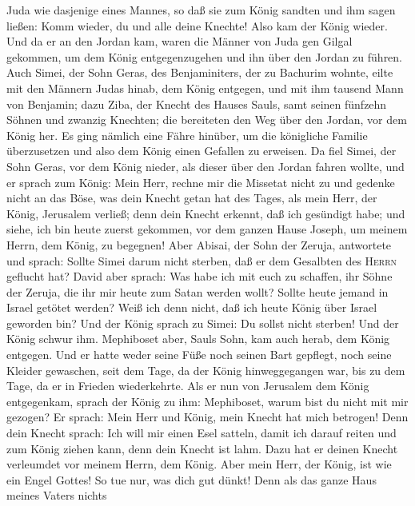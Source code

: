 Juda wie dasjenige eines Mannes, so daß sie zum König sandten und ihm
sagen ließen: Komm wieder, du und alle deine Knechte! 
Also kam der König wieder. Und da er an den Jordan kam, waren die Männer
von Juda gen Gilgal gekommen, um dem König entgegenzugehen und ihn über
den Jordan zu führen.  Auch Simei, der Sohn Geras, des
Benjaminiters, der zu Bachurim wohnte, eilte mit den Männern Judas
hinab, dem König entgegen,  und mit ihm tausend Mann von
Benjamin; dazu Ziba, der Knecht des Hauses Sauls, samt seinen fünfzehn
Söhnen und zwanzig Knechten; die bereiteten den Weg über den Jordan, vor
dem König her.  Es ging nämlich eine Fähre hinüber, um
die königliche Familie überzusetzen und also dem König einen Gefallen zu
erweisen. Da fiel Simei, der Sohn Geras, vor dem König nieder, als
dieser über den Jordan fahren wollte,  und er sprach zum
König: Mein Herr, rechne mir die Missetat nicht zu und gedenke nicht an
das Böse, was dein Knecht getan hat des Tages, als mein Herr, der König,
Jerusalem verließ;  denn dein Knecht erkennt, daß ich
gesündigt habe; und siehe, ich bin heute zuerst gekommen, vor dem ganzen
Hause Joseph, um meinem Herrn, dem König, zu begegnen! 
Aber Abisai, der Sohn der Zeruja, antwortete und sprach: Sollte Simei
darum nicht sterben, daß er dem Gesalbten des \textsc{Herrn} geflucht
hat?  David aber sprach: Was habe ich mit euch zu
schaffen, ihr Söhne der Zeruja, die ihr mir heute zum Satan werden
wollt? Sollte heute jemand in Israel getötet werden? Weiß ich denn
nicht, daß ich heute König über Israel geworden bin?  Und
der König sprach zu Simei: Du sollst nicht sterben! Und der König schwur
ihm.  Mephiboset aber, Sauls Sohn, kam auch herab, dem
König entgegen. Und er hatte weder seine Füße noch seinen Bart gepflegt,
noch seine Kleider gewaschen, seit dem Tage, da der König hinweggegangen
war, bis zu dem Tage, da er in Frieden wiederkehrte.  Als
er nun von Jerusalem dem König entgegenkam, sprach der König zu ihm:
Mephiboset, warum bist du nicht mit mir gezogen?  Er
sprach: Mein Herr und König, mein Knecht hat mich betrogen! Denn dein
Knecht sprach: Ich will mir einen Esel satteln, damit ich darauf reiten
und zum König ziehen kann, denn dein Knecht ist lahm. 
Dazu hat er deinen Knecht verleumdet vor meinem Herrn, dem König. Aber
mein Herr, der König, ist wie ein Engel Gottes! So tue nur, was dich gut
dünkt!  Denn als das ganze Haus meines Vaters nichts
